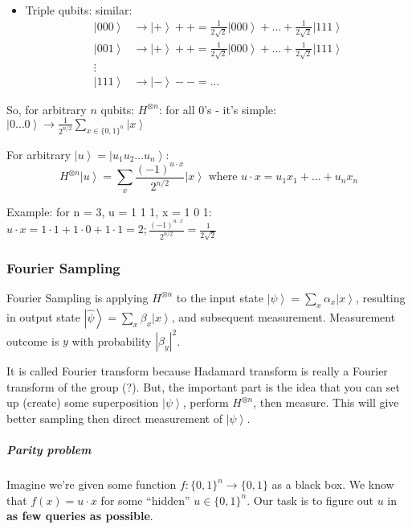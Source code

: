 \documentclass{scrartcl}
\newcommand{\ket}[1]{\left| #1 \right>} %
\begin{document}
\begin{itemize}
\begin{equation*}
\begin{split}
    \end{split}
  \end{equation*}
\item Triple qubits: similar:
  \begin{equation*} \begin{split} \ket{000} &\to \ket+++ = \frac1{2\sqrt2}
      \ket{000} + \dots +
      \frac1{2\sqrt2} \ket{111} \\
      \ket{001} &\to \ket+++ = \frac1{2\sqrt2} \ket{000} + \dots +
      \frac1{2\sqrt2} \ket{111} \\
      \vdots \\
      \ket{111} &\to \ket--- = \dots
    \end{split}
  \end{equation*}
\end{itemize}

So, for arbitrary $n$ qubits: $H^{\otimes n}$: for all 0's - it's simple: $
\ket{0 \dots 0} \to \frac1{2^{n/2}} \sum \limits_{x \in \{0, 1\}^n} \ket x $

For arbitrary $\ket u = \ket {u_1 u_2 \dots u_n}$:
$$H^{\otimes n} \ket u = \sum_x \frac{(-1)^{u \cdot x}}{2^{n/2}} \ket x \text{ where }u
\cdot x = u_1 x_1 + \dots + u_n x_n $$

Example: for n = 3, u = 1 1 1, x = 1 0 1: $u \cdot x = 1 \cdot 1 + 1 \cdot 0 + 1
\cdot 1 = 2; \frac{(-1)^{u \cdot x}}{2^{n/2}} = \frac1{2\sqrt2}$

\subsubsection{Fourier Sampling}
\label{sec:FourierSampling}

Fourier Sampling is applying $H^{\otimes n}$ to the input state $\ket \psi =
\sum \limits_x \alpha_x \ket x$, resulting in output state $\ket {\hat \psi} =
\sum \limits_x \beta_x \ket x$, and subsequent measurement. Measurement outcome
is $y$ with probability $|\beta_y|^2$.

It is called Fourier transform because Hadamard transform is really a Fourier
transform of the group (?). But, the important part is the idea that you can set
up (create) some superposition $\ket \psi$, perform $H^{\otimes n}$, then
measure. This will give better sampling then direct measurement of $\ket\psi$.

\subparagraph{Parity problem}

Imagine we're given some function $f: \{0, 1\}^n \to \{0, 1\}$ as a black box.
We know that $f(x) = u \cdot x$ for some ``hidden'' $u \in \{0, 1\}^n$. Our task
is to figure out $u$ in {\bf as few queries as possible}.
\end{document}
